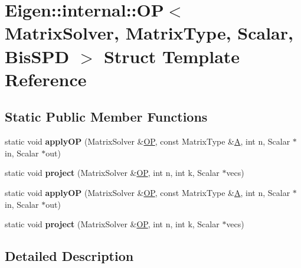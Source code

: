 \hypertarget{struct_eigen_1_1internal_1_1_o_p}{}\section{Eigen\+:\+:internal\+:\+:OP$<$ Matrix\+Solver, Matrix\+Type, Scalar, Bis\+S\+PD $>$ Struct Template Reference}
\label{struct_eigen_1_1internal_1_1_o_p}
\subsection*{Static Public Member Functions}
\begin{DoxyCompactItemize}
\item 
\mbox{\label{struct_eigen_1_1internal_1_1_o_p_a84f889851396fbeb02979b8b6ee3936e}} 
static void {\bfseries apply\+OP} (Matrix\+Solver \&\hyperlink{struct_eigen_1_1internal_1_1_o_p}{OP}, const Matrix\+Type \&\hyperlink{group___core___module_class_eigen_1_1_matrix}{A}, int n, Scalar $\ast$in, Scalar $\ast$out)
\item 
\mbox{\label{struct_eigen_1_1internal_1_1_o_p_a09cd5c86fad9d98fd88621c581479355}} 
static void {\bfseries project} (Matrix\+Solver \&\hyperlink{struct_eigen_1_1internal_1_1_o_p}{OP}, int n, int k, Scalar $\ast$vecs)
\item 
\mbox{\label{struct_eigen_1_1internal_1_1_o_p_a84f889851396fbeb02979b8b6ee3936e}} 
static void {\bfseries apply\+OP} (Matrix\+Solver \&\hyperlink{struct_eigen_1_1internal_1_1_o_p}{OP}, const Matrix\+Type \&\hyperlink{group___core___module_class_eigen_1_1_matrix}{A}, int n, Scalar $\ast$in, Scalar $\ast$out)
\item 
\mbox{\label{struct_eigen_1_1internal_1_1_o_p_a09cd5c86fad9d98fd88621c581479355}} 
static void {\bfseries project} (Matrix\+Solver \&\hyperlink{struct_eigen_1_1internal_1_1_o_p}{OP}, int n, int k, Scalar $\ast$vecs)
\end{DoxyCompactItemize}


\subsection{Detailed Description}
